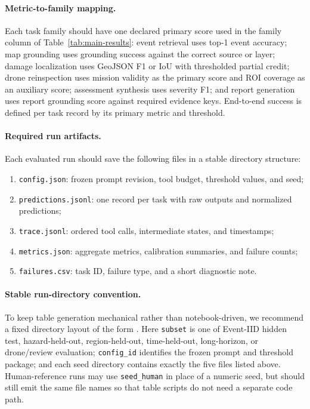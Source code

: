 \documentclass{article}
\begin{document}
\paragraph{Metric-to-family mapping.}
Each task family should have one declared primary score used in the family column of Table~\ref{tab:main-results}: event retrieval uses top-1 event accuracy; map grounding uses grounding success against the correct source or layer; damage localization uses GeoJSON F1 or IoU with thresholded partial credit; drone reinspection uses mission validity as the primary score and ROI coverage as an auxiliary score; assessment synthesis uses severity F1; and report generation uses report grounding score against required evidence keys. End-to-end success is defined per task record by its primary metric and threshold.

\paragraph{Required run artifacts.}
Each evaluated run should save the following files in a stable directory structure:
\begin{enumerate}[leftmargin=1.2em]
    \item \texttt{config.json}: frozen prompt revision, tool budget, threshold values, and seed;
    \item \texttt{predictions.jsonl}: one record per task with raw outputs and normalized predictions;
    \item \texttt{trace.jsonl}: ordered tool calls, intermediate states, and timestamps;
    \item \texttt{metrics.json}: aggregate metrics, calibration summaries, and failure counts;
    \item \texttt{failures.csv}: task ID, failure type, and a short diagnostic note.
\end{enumerate}

\paragraph{Stable run-directory convention.}
To keep table generation mechanical rather than notebook-driven, we recommend a fixed directory layout of the form . Here \texttt{subset} is one of Event-IID hidden test, hazard-held-out, region-held-out, time-held-out, long-horizon, or drone/review evaluation; \texttt{config\_id} identifies the frozen prompt and threshold package; and each seed directory contains exactly the five files listed above. Human-reference runs may use \texttt{seed\_human} in place of a numeric seed, but should still emit the same file names so that table scripts do not need a separate code path.
\end{document}

